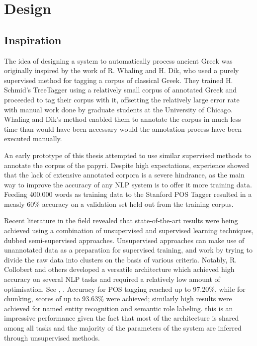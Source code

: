 \chapter{Design}
\label{chp:design} %

\section{Inspiration}
\label{sec:inspiration}

The idea of designing a system to automatically process ancient Greek
was originally inspired by the work of R. Whaling and H. Dik, who used
a purely supervised method for tagging a corpus of classical
Greek. They trained H. Schmid's TreeTagger using a relatively small
corpus of annotated Greek and proceeded to tag their corpus with it,
offsetting the relatively large error rate with manual work done by
graduate students at the University of Chicago. Whaling and Dik's
method enabled them to annotate the corpus in much less time than
would have been necessary would the annotation process have been
executed manually.

An early prototype of this thesis attempted to use similar supervised
methods to annotate the corpus of the papyri. Despite high
expectations, experience showed that the lack of extensive annotated
corpora is a severe hindrance, as the main way to improve the accuracy
of any NLP system is to offer it more training data. Feeding 400.000
words as training data to the Stanford POS Tagger resulted in a measly
60\% accuracy on a validation set held out from the training corpus.

Recent literature in the field revealed that state-of-the-art results
were being achieved using a combination of unsupervised and supervised
learning techniques, dubbed semi-supervised approaches. Unsupervised
approaches can make use of unannotated data as a preparation for
supervised training, and work by trying to divide the raw data into
clusters on the basis of various criteria. Notably, R. Collobert and
others developed a versatile architecture which achieved high accuracy
on several NLP tasks and required a relatively low amount of
optimisation. See \citet{collobert2008}, \citet{collobert-2011}. Accuracy
for POS tagging reached up to 97.20\%, while for chunking, scores of
up to 93.63\% were achieved; similarly high results were achieved for
named entity recognition and semantic role labeling. this is an
impressive performance given the fact that most of the architecture is
shared among all tasks and the majority of the parameters of the
system are inferred through unsupervised methods. 

